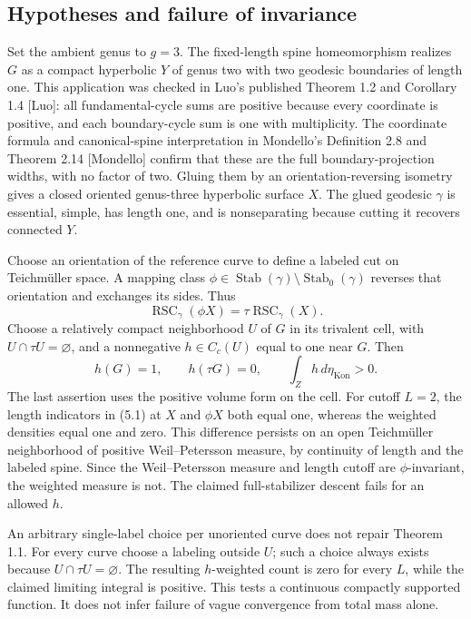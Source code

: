 \documentclass[10pt]{article}
\begin{document}
\subsection*{Hypotheses and failure of invariance}
Set the ambient genus to \(g=3\). The fixed-length spine homeomorphism realizes \(G\) as a compact hyperbolic \(Y\) of genus two with two geodesic boundaries of length one. This application was checked in Luo’s published Theorem 1.2 and Corollary 1.4 [Luo]: all fundamental-cycle sums are positive because every coordinate is positive, and each boundary-cycle sum is one with multiplicity. The coordinate formula and canonical-spine interpretation in Mondello’s Definition 2.8 and Theorem 2.14 [Mondello] confirm that these are the full boundary-projection widths, with no factor of two. Gluing them by an orientation-reversing isometry gives a closed oriented genus-three hyperbolic surface \(X\). The glued geodesic \(\gamma\) is essential, simple, has length one, and is nonseparating because cutting it recovers connected \(Y\).\par
Choose an orientation of the reference curve to define a labeled cut on Teichmüller space. A mapping class \(\phi\in\operatorname{Stab}(\gamma)\setminus\operatorname{Stab}_0(\gamma)\) reverses that orientation and exchanges its sides. Thus \[\operatorname{RSC}_\gamma(\phi X)=\tau\operatorname{RSC}_\gamma(X).\] Choose a relatively compact neighborhood \(U\) of \(G\) in its trivalent cell, with \(U\cap\tau U=\varnothing\), and a nonnegative \(h\in C_c(U)\) equal to one near \(G\). Then \[h(G)=1,\qquad h(\tau G)=0,\qquad
 \int_Zh\,d\eta_{\operatorname{Kon}}>0.\] The last assertion uses the positive volume form on the cell. For cutoff \(L=2\), the length indicators in (5.1) at \(X\) and \(\phi X\) both equal one, whereas the weighted densities equal one and zero. This difference persists on an open Teichmüller neighborhood of positive Weil–Petersson measure, by continuity of length and the labeled spine. Since the Weil–Petersson measure and length cutoff are \(\phi\)-invariant, the weighted measure is not. The claimed full-stabilizer descent fails for an allowed \(h\).\par
An arbitrary single-label choice per unoriented curve does not repair Theorem 1.1. For every curve choose a labeling outside \(U\); such a choice always exists because \(U\cap\tau U=\varnothing\). The resulting \(h\)-weighted count is zero for every \(L\), while the claimed limiting integral is positive. This tests a continuous compactly supported function. It does not infer failure of vague convergence from total mass alone.\par
\end{document}
